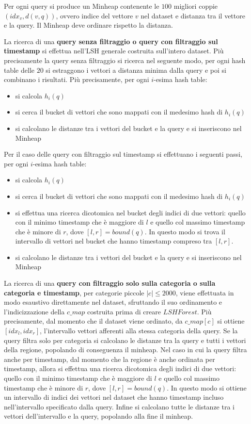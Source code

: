 Per ogni query si produce un Minheap contenente le $100$ migliori coppie 
$(idx_v, d(v,q))$, ovvero indice del vettore $v$ nel dataset e distanza tra il vettore
e la query. Il Minheap deve ordinare rispetto la distanza.

La ricerca di una \textbf{query senza filtraggio o query con filtraggio sul timestamp} 
si effettua nell'LSH generale costruita sull'intero dataset. Più precisamente la 
query senza filtraggio si ricerca nel seguente modo, per ogni hash table 
delle $20$ si estraggono i vettori a distanza minima dalla query e poi si combinano 
i risultati. Più precisamente, per ogni $i$-esima hash table:
\begin{itemize}
    \item si calcola $h_i(q)$
    \item si cerca il bucket di vettori che sono mappati con il medesimo hash 
    di $h_i(q)$
    \item si calcolano le distanze tra i vettori del bucket e la query e si inseriscono
    nel Minheap
\end{itemize}
Per il caso delle query con filtraggio sul timestamp si effettuano i seguenti passi,
per ogni $i$-esima hash table:
\begin{itemize}
    \item si calcola $h_i(q)$
    \item si cerca il bucket di vettori che sono mappati con il medesimo hash 
    di $h_i(q)$
    \item si effettua una ricerca dicotomica nel bucket degli indici di due vettori: quello con 
    il minimo timestamp che è maggiore di $l$ e quello col massimo timestamp che 
    è minore di $r$, dove $[l,r] = bound(q)$. In questo modo si trova il intervallo di vettori nel bucket 
    che hanno timestamp compreso tra $[l,r]$.
    \item si calcolano le distanze tra i vettori del bucket e la query e si inseriscono
    nel Minheap
\end{itemize}

La ricerca di una \textbf{query con filtraggio solo sulla categoria o sulla categoria e timestamp}, 
per categorie piccole $|c|\le 2000$, viene effettuata in modo esaustivo direttamente nel dataset,
sfruttando il suo ordinamento e l'indicizzazione della $c\_map$ costruita 
prima di creare $LSHForest$. 
Più precisamente, dal momento che il dataset viene ordinato, da $c\_map[c]$
si ottiene $[idx_l, idx_r]$, l'intervallo vettori afferenti alla stessa categoria della query. 
Se la query filtra solo per categoria si calcolano le distanze tra la query e tutti 
i vettori della regione, popolando di conseguenza il minheap. 
Nel caso in cui la query filtra anche per timestamp, 
dal momento che la regione è anche ordinata per timestamp, allora si effettua 
una ricerca dicotomica degli indici di due vettori: quello con il minimo timestamp che è 
maggiore di $l$ e quello col massimo timestamp che è minore di $r$, dove $[l,r] = bound(q)$.
In questo modo si ottiene un intervallo 
di indici dei vettori nel dataset che hanno timestamp incluso 
nell'intervallo specificato dalla query. Infine si calcolano tutte le distanze 
tra i vettori dell'intervallo e la query, popolando alla fine il minheap.

